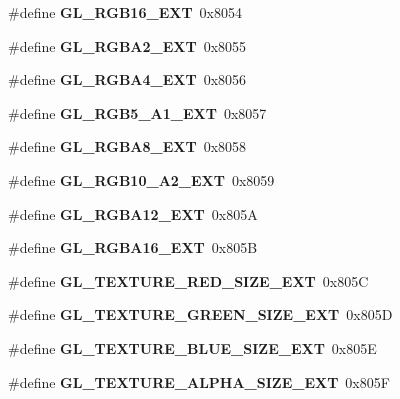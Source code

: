 \begin{DoxyCompactItemize}
\item 
\#define {\bfseries G\+L\+\_\+\+R\+G\+B16\+\_\+\+E\+X\+T}~0x8054\label{_s_d_l__opengl_8h_a18c67a0ae67a254d1cc03ca0bb719e70}

\item 
\#define {\bfseries G\+L\+\_\+\+R\+G\+B\+A2\+\_\+\+E\+X\+T}~0x8055\label{_s_d_l__opengl_8h_ae9cf65a62138576a1677003f6474ce1e}

\item 
\#define {\bfseries G\+L\+\_\+\+R\+G\+B\+A4\+\_\+\+E\+X\+T}~0x8056\label{_s_d_l__opengl_8h_ad409795f8b17abcf52d3fa5c86a1f266}

\item 
\#define {\bfseries G\+L\+\_\+\+R\+G\+B5\+\_\+\+A1\+\_\+\+E\+X\+T}~0x8057\label{_s_d_l__opengl_8h_a9a3204d8b9137b2eb6e834a0e2a8854b}

\item 
\#define {\bfseries G\+L\+\_\+\+R\+G\+B\+A8\+\_\+\+E\+X\+T}~0x8058\label{_s_d_l__opengl_8h_ad386e8d98e3b2373dec5339e3e66f5f9}

\item 
\#define {\bfseries G\+L\+\_\+\+R\+G\+B10\+\_\+\+A2\+\_\+\+E\+X\+T}~0x8059\label{_s_d_l__opengl_8h_a2e68d1bf78c40b8ff2864430a4e5a4df}

\item 
\#define {\bfseries G\+L\+\_\+\+R\+G\+B\+A12\+\_\+\+E\+X\+T}~0x805\+A\label{_s_d_l__opengl_8h_a80efdaa7ab6f57b3eb8e8cf0202ff167}

\item 
\#define {\bfseries G\+L\+\_\+\+R\+G\+B\+A16\+\_\+\+E\+X\+T}~0x805\+B\label{_s_d_l__opengl_8h_a7ac6a9e37905c215118d969e90fb712f}

\item 
\#define {\bfseries G\+L\+\_\+\+T\+E\+X\+T\+U\+R\+E\+\_\+\+R\+E\+D\+\_\+\+S\+I\+Z\+E\+\_\+\+E\+X\+T}~0x805\+C\label{_s_d_l__opengl_8h_ace566ddf2214472331eae346896e83cf}

\item 
\#define {\bfseries G\+L\+\_\+\+T\+E\+X\+T\+U\+R\+E\+\_\+\+G\+R\+E\+E\+N\+\_\+\+S\+I\+Z\+E\+\_\+\+E\+X\+T}~0x805\+D\label{_s_d_l__opengl_8h_a6557cfa5f4e56569fb6cd3eac7163cbe}

\item 
\#define {\bfseries G\+L\+\_\+\+T\+E\+X\+T\+U\+R\+E\+\_\+\+B\+L\+U\+E\+\_\+\+S\+I\+Z\+E\+\_\+\+E\+X\+T}~0x805\+E\label{_s_d_l__opengl_8h_a59b5314092b639d3bb8a8ef14df5248d}

\item 
\#define {\bfseries G\+L\+\_\+\+T\+E\+X\+T\+U\+R\+E\+\_\+\+A\+L\+P\+H\+A\+\_\+\+S\+I\+Z\+E\+\_\+\+E\+X\+T}~0x805\+F\label{_s_d_l__opengl_8h_a33698dacfd072ed95ae3e5fb3556d8ec}


\end{DoxyCompactItemize}
